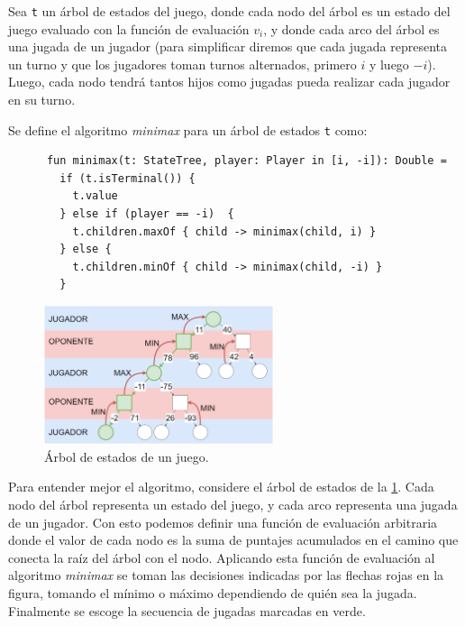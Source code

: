   \begin{definition}
    Sea \texttt{t} un árbol de estados del juego, donde cada nodo del árbol es un estado del juego
    evaluado con la función de evaluación \(v_i\), y donde cada arco del árbol es una jugada de un
    jugador (para simplificar diremos que cada jugada representa un turno y que los jugadores 
    toman turnos alternados, primero \(i\) y luego \(-i\)).
    Luego, cada nodo tendrá tantos hijos como jugadas pueda realizar cada jugador en su turno.

    Se define el algoritmo \textit{minimax} para un árbol de estados \texttt{t} como:
    
    \begin{verbatim}
      fun minimax(t: StateTree, player: Player in [i, -i]): Double =
        if (t.isTerminal()) {
          t.value
        } else if (player == -i)  {
          t.children.maxOf { child -> minimax(child, i) }
        } else {
          t.children.minOf { child -> minimax(child, -i) }
        } 
    \end{verbatim}
  \end{definition}

  
  \begin{figure}[ht!]
    \centering
    \includegraphics[width=0.6\textwidth]{img/minimax.drawio.png}
    \caption{Árbol de estados de un juego.}
    \label{fig:minimax-tree}
  \end{figure}

  Para entender mejor el algoritmo, considere el árbol de estados de la 
  \cref{fig:minimax-tree}.
  Cada nodo del árbol representa un estado del juego, y cada arco representa una jugada de un 
  jugador.
  Con esto podemos definir una función de evaluación arbitraria donde el valor de cada nodo
  es la suma de puntajes acumulados en el camino que conecta la raíz del árbol con el nodo.
  Aplicando esta función de evaluación al algoritmo \textit{minimax} se toman las decisiones
  indicadas por las flechas rojas en la figura, tomando el mínimo o máximo dependiendo de quién
  sea la jugada.
  Finalmente se escoge la secuencia de jugadas marcadas en verde.